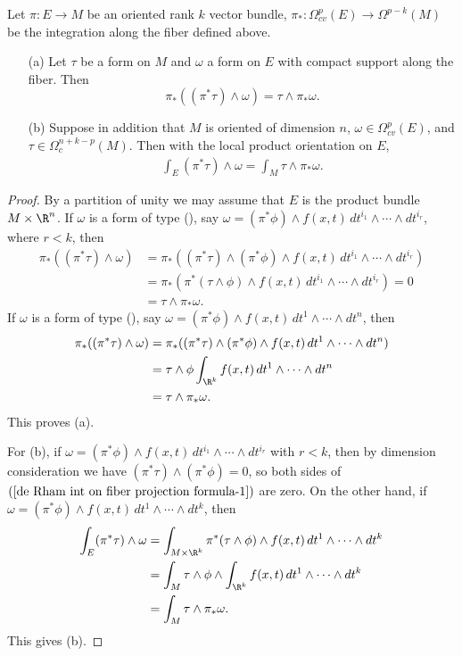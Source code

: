 \begin{proposition}
Let $\pi:E\to M$ be an oriented rank $k$ vector bundle, $\pi_*:\Omega^p_{cv}(E)\to\Omega^{p-k}(M)$ be the integration along the fiber defined above.
\begin{itemize}
\item[(a)] Let $\tau$ be a form on $M$ and $\omega$ a form on $E$ with compact support along the fiber. Then
\[\pi_*((\pi^*\tau)\wedge\omega)=\tau\wedge\pi_*\omega.\] 
\item[(b)] Suppose in addition that $M$ is oriented of dimension $n$, $\omega\in\Omega^p_{cv}(E)$, and $\tau\in\Omega^{n+k-p}_c(M)$. Then with the local product 
orientation on $E$,
\begin{align}\label{de Rham int on fiber projection formula-1}
\int_E(\pi^*\tau)\wedge\omega=\int_M\tau\wedge\pi_*\omega.
\end{align}
\end{itemize}
\end{proposition}
\begin{proof}
By a partition of unity we may assume that $E$ is the product bundle $M\times\R^n$. If $\omega$ is a form of type (), say $\omega=(\pi^*\phi)\wedge f(x,t)\,dt^{i_1}\wedge\cdots\wedge dt^{i_r}$, 
where $r<k$, then
\begin{align*}
\pi_*((\pi^*\tau)\wedge\omega)&=\pi_*((\pi^*\tau)\wedge(\pi^*\phi)\wedge f(x,t)\,dt^{i_1}\wedge\cdots\wedge dt^{i_r})\\
&=\pi_*(\pi^*(\tau\wedge\phi)\wedge f(x,t)\,dt^{i_1}\wedge\cdots\wedge dt^{i_r})=0\\
&=\tau\wedge\pi_*\omega.
\end{align*}
If $\omega$ is a form of type (), say $\omega=(\pi^*\phi)\wedge f(x,t)\,dt^{1}\wedge\cdots\wedge dt^{n}$, then
\begin{align*}
\pi_*((\pi^*\tau)\wedge\omega)&=\pi_*((\pi^*\tau)\wedge(\pi^*\phi)\wedge f(x,t)\,dt^{1}\wedge\cdots\wedge dt^{n})\\
&=\tau\wedge\phi\int_{\R^k}f(x,t)\,dt^{1}\wedge\cdots\wedge dt^{n}\\
&=\tau\wedge\pi_*\omega.
\end{align*}
This proves (a).\par
For (b), if $\omega=(\pi^*\phi)\wedge f(x,t)\,dt^{i_1}\wedge\cdots\wedge dt^{i_r}$ with $r<k$, then by dimension consideration we have $(\pi^*\tau)\wedge(\pi^*\phi)=0$, 
so both sides of $(\ref{de Rham int on fiber projection formula-1})$ are zero. On the other hand, if $\omega=(\pi^*\phi)\wedge f(x,t)\,dt^{1}\wedge\cdots\wedge dt^{k}$, then
\begin{align*}
\int_E(\pi^*\tau)\wedge\omega&=\int_{M\times\R^k}\pi^*(\tau\wedge\phi)\wedge f(x,t)\,dt^1\wedge\cdots\wedge dt^k\\
&=\int_M\tau\wedge\phi\wedge\int_{\R^k}f(x,t)\,dt^1\wedge\cdots\wedge dt^k\\
&=\int_M\tau\wedge\pi_*\omega.
\end{align*}
This gives (b).
\end{proof}
